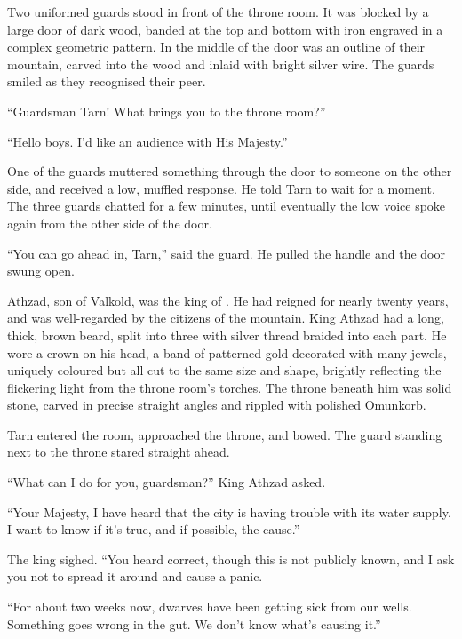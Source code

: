 
Two uniformed guards stood in front of the throne room.  It was blocked by a large door of dark wood, banded at the top and bottom with iron engraved in a complex geometric pattern.  In the middle of the door was an outline of their mountain, carved into the wood and inlaid with bright silver wire.  The guards smiled as they recognised their peer.

``Guardsman Tarn!  What brings you to the throne room?''

``Hello boys.  I'd like an audience with His Majesty.''

One of the guards muttered something through the door to someone on the other side, and received a low, muffled response.  He told Tarn to wait for a moment.  The three guards chatted for a few minutes, until eventually the low voice spoke again from the other side of the door.

``You can go ahead in, Tarn,'' said the guard.  He pulled the handle and the door swung open.

Athzad, son of Valkold, was the king of \korbarthrond.  He had reigned for nearly twenty years, and was well-regarded by the citizens of the mountain.  King Athzad had a long, thick, brown beard, split into three with silver thread braided into each part.  He wore a crown on his head, a band of patterned gold decorated with many jewels, uniquely coloured but all cut to the same size and shape, brightly reflecting the flickering light from the throne room's torches.  The throne beneath him was solid stone, carved in precise straight angles and rippled with polished Omunkorb.

Tarn entered the room, approached the throne, and bowed.  The guard standing next to the throne stared straight ahead.

``What can I do for you, guardsman?'' King Athzad asked.

``Your Majesty, I have heard that the city is having trouble with its water supply.  I want to know if it's true, and if possible, the cause.''

The king sighed.  ``You heard correct, though this is not publicly known, and I ask you not to spread it around and cause a panic.

``For about two weeks now, dwarves have been getting sick from our wells.  Something goes wrong in the gut.  We don't know what's causing it.''

